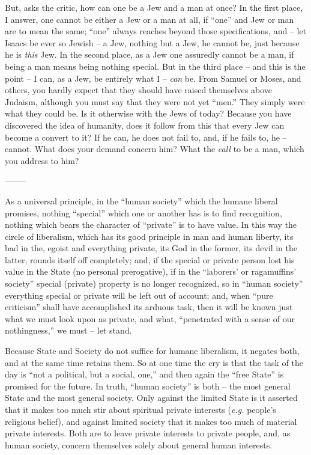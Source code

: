 But, asks the critic, how can one be a Jew and a man at once? In the first 
place, I answer, one cannot be either a Jew or a man at all, if ``one'' and 
Jew or man are to mean the same; ``one'' always reaches beyond those 
specifications, and -- let Isaacs be ever so Jewish -- a Jew, nothing but a 
Jew, he cannot be, just because he is \textit{this} Jew. In the second place, 
as a Jew one assuredly cannot be a man, if being a man means being nothing 
special. But in the third place -- and this is the point -- I can, as a Jew, 
be entirely what I -- \textit{can} be. From Samuel or Moses, and others, you 
hardly expect that they should have raised themselves above Judaism, although 
you must say that they were not yet ``men.'' They simply were what they 
could be. Is it otherwise with the Jews of today? Because you have discovered 
the idea of humanity, does it follow from this that every Jew can become a 
convert to it? If he can, he does not fail to, and, if he fails to, he -- 
cannot. What does your demand concern him? What the \textit{call} to be a man, 
which you address to him?

\begin{center}
--------\end{center}


As a universal principle, in the ``human society'' which the humane liberal 
promises, nothing ``special'' which one or another has is to find 
recognition, nothing which bears the character of ``private'' is to have 
value. In this way the circle of liberalism, which has its good principle in 
man and human liberty, its bad in the, egoist and everything private, its God 
in the former, its devil in the latter, rounds itself off completely; and, if 
the special or private person lost his value in the State (no personal 
prerogative), if in the ``laborers' or ragamuffins' society'' special 
(private) property is no longer recognized, so in ``human society'' 
everything special or private will be left out of account; and, when ``pure 
criticism'' shall have accomplished its arduous task, then it will be known 
just what we must look upon as private, and what, ``penetrated with a sense 
of our nothingness,'' we must -- let stand.

Because State and Society do not suffice for humane liberalism, it negates 
both, and at the same time retains them. So at one time the cry is that the 
task of the day is ``not a political, but a social, one,'' and then again 
the ``free State'' is promised for the future. In truth, ``human society'' 
is both -- the most general State and the most general society. Only against 
the limited State is it asserted that it makes too much stir about spiritual 
private interests (\textit{e.g.} people's religious belief), and against 
limited society that it makes too much of material private interests. Both are 
to leave private interests to private people, and, as human society, concern 
themselves solely about general human interests.

